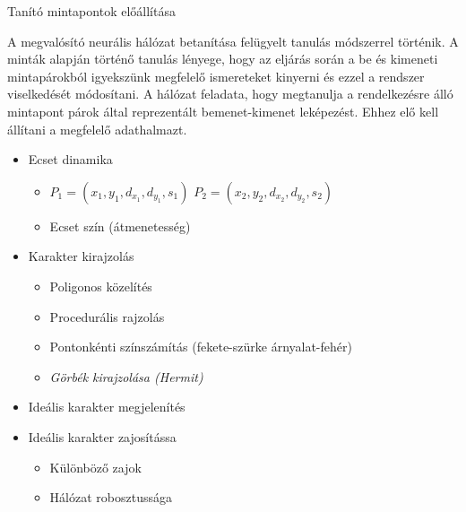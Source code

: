 
Tanító mintapontok előállítása

A megvalósító neurális hálózat betanítása felügyelt tanulás módszerrel történik. A minták alapján történő tanulás lényege, hogy az eljárás során a be és kimeneti mintapárokból igyekszünk megfelelő ismereteket kinyerni és ezzel a rendszer viselkedését módosítani. A hálózat feladata, hogy megtanulja a rendelkezésre álló mintapont párok által reprezentált bemenet-kimenet leképezést. Ehhez elő kell állítani a megfelelő adathalmazt.

\begin{itemize}
\item Ecset dinamika
	\begin{itemize}
	\item \(P_1 = (x_1, y_1, d_{x_1}, d_{y_1}, s_1)\) \(P_2 = (x_2, y_2, d_{x_2}, d_{y_2}, s_2)\)
	\item Ecset szín (átmenetesség)
	\end{itemize}
\item Karakter kirajzolás
	\begin{itemize}
	\item Poligonos közelítés
	\item Procedurális rajzolás
	\item Pontonkénti színszámítás (fekete-szürke árnyalat-fehér)
	\item \textit{Görbék kirajzolása (Hermit)}
	\end{itemize}
\item Ideális karakter megjelenítés
\item Ideális karakter zajosítássa
	\begin{itemize}
	\item Különböző zajok
	\item Hálózat robosztussága
	\end{itemize}
\end{itemize}